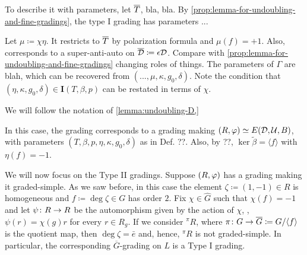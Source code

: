 












To describe it with parameters, let $\barr T$, bla, bla. 
By \cref{prop:lemma-for-undoubling-and-fine-gradings}, the type I grading has parameters ...

Let $\mu \coloneqq \chi \eta$. 
It restricts to $\barr T$ by polarization formula and $\mu(f) = +1$. 
Also, corresponds to a super-anti-auto on $\overline{\mathcal{D}} \coloneqq \epsilon \mathcal{D}$. 
Compare with \cref{prop:lemma-for-undoubling-and-fine-gradings} changing roles of things. 
The parameters of $\Gamma$ are blah, which can be recovered from $(..., \mu, \kappa, g_0, \delta)$. 
Note the condition that $(\eta, \kappa, g_0, \delta) \in \mathbf{I}(T, \beta, p)$ can be restated in terms of $\chi$. 



We will follow the notation of \cref{lemma:undoubling-D,}


In this case, the grading corresponds to a grading making $(R, \varphi) \simeq E(\mathcal{D}, \mathcal U, B)$, with parameters $(T, \beta, p, \eta, \kappa, g_0, \delta)$ as in Def. ??. 
Also, by ??, $\ker \tilde\beta = \langle f \rangle$ with $\eta(f) = -1$. 

We will now focus on the Type II gradings. 
Suppose $(R, \varphi)$ has a grading making it graded-simple. 
As we saw before, in this case the element $\zeta \coloneqq (1, -1) \in R$ is homogeneous and $f \coloneqq \deg \zeta \in G$ has order $2$. 
Fix $\chi \in \widehat G$ such that $\chi (f) = -1$ and let $\psi\colon R \to R$ be the automorphism given by the action of $\chi$, \ie, $\psi(r) = \chi(g) r$ for every $r\in R_g$. 
If we consider ${}^\pi R$, where $\pi\colon G\to \overline{G} \coloneqq G/\langle f \rangle$ is the quotient map, then $\deg \zeta = \bar e$ and, hence, ${}^\pi R$ is not graded-simple. 
In particular, the corresponding $\overline{G}$-grading on $L$ is a Type I grading. 

